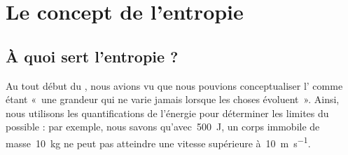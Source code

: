 \section{Le concept de l’entropie}

	\subsection{À quoi sert l’entropie ?}
	\label{ch_utilite_entropie}
	
		Au tout début du \coursun, nous avions vu que nous pouvions conceptualiser l’ comme étant «~une grandeur qui ne varie jamais lorsque les choses évoluent~». Ainsi, nous utilisons les quantifications de l’énergie pour déterminer les limites du possible : par exemple, nous savons qu’avec~\SI{500}{\joule}, un corps immobile de masse~\SI{10}{\kilogram} ne peut pas atteindre une vitesse supérieure à~\SI{10}{\metre\per\second}.
	
